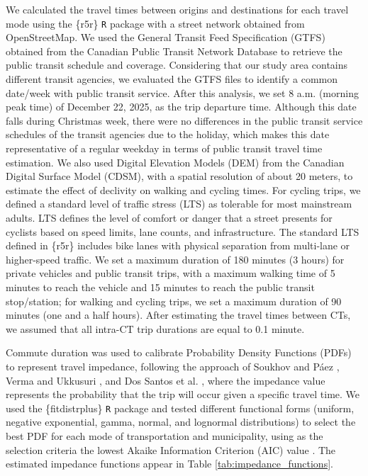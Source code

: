 \documentclass[preprint, 3p,
authoryear]{elsarticle} %
\begin{document}
We calculated the travel times between origins and destinations for each
travel mode using the \{r5r\} \texttt{R} package \citep{pereira2021a}
with a street network obtained from OpenStreetMap. We used the General
Transit Feed Specification (GTFS) obtained from the Canadian Public
Transit Network Database \citep{statisticscanada} to retrieve the public
transit schedule and coverage. Considering that our study area contains
different transit agencies, we evaluated the GTFS files to identify a
common date/week with public transit service. After this analysis, we
set 8 a.m. (morning peak time) of December 22, 2025, as the trip
departure time. Although this date falls during Christmas week, there
were no differences in the public transit service schedules of the
transit agencies due to the holiday, which makes this date
representative of a regular weekday in terms of public transit travel
time estimation. We also used Digital Elevation Models (DEM) from the
Canadian Digital Surface Model (CDSM), with a spatial resolution of
about 20 meters, to estimate the effect of declivity on walking and
cycling times. For cycling trips, we defined a standard level of traffic
stress (LTS) as tolerable for most mainstream adults. LTS defines the
level of comfort or danger that a street presents for cyclists based on
speed limits, lane counts, and infrastructure. The standard LTS defined
in \{r5r\} \citep{pereira2021a} includes bike lanes with physical
separation from multi-lane or higher-speed traffic. We set a maximum
duration of 180 minutes (3 hours) for private vehicles and public
transit trips, with a maximum walking time of 5 minutes to reach the
vehicle and 15 minutes to reach the public transit stop/station; for
walking and cycling trips, we set a maximum duration of 90 minutes (one
and a half hours). After estimating the travel times between CTs, we
assumed that all intra-CT trip durations are equal to 0.1 minute.

Commute duration was used to calibrate Probability Density Functions
(PDFs) to represent travel impedance, following the approach of Soukhov
and Páez \citeyearpar{soukhov2024a}, Verma and Ukkusuri
\citeyearpar{verma2025}, and Dos Santos et al.
\citeyearpar{dossantos2026}, where the impedance value represents the
probability that the trip will occur given a specific travel time. We
used the \{fitdistrplus\} \texttt{R} package
\citep{delignette-muller2015} and tested different functional forms
(uniform, negative exponential, gamma, normal, and lognormal
distributions) to select the best PDF for each mode of transportation
and municipality, using as the selection criteria the lowest Akaike
Information Criterion (AIC) value \citep{akaike1974}. The estimated
impedance functions appear in Table \ref{tab:impedance_functions}.
\end{document}
